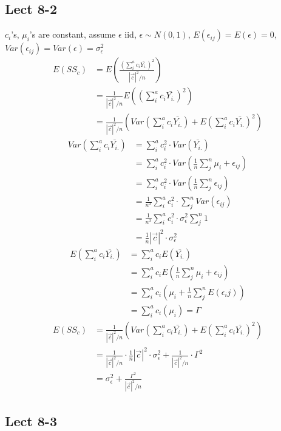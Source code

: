 \documentclass[11pt,letterpaper]{article}
\begin{document}
\subsection*{Lect 8-2}
\noindent $c_i$'s, $\mu_i$'s are constant, assume $\epsilon$ iid, $\epsilon \sim N(0, 1)$, $E(\epsilon_{ij}) = E(\epsilon) = 0$, $Var(\epsilon_{ij}) = Var(\epsilon) = \sigma_{\epsilon}^2$
\begin{align*}
E(SS_c) &= E( \frac{(\sum_i^a c_i \bar{Y_{i.}})^2}{|\vec{c}|^2 / n} ) \\
&= \frac{1}{|\vec{c}|^2 / n} E((\sum_i^a c_i \bar{Y_{i.}})^2 ) \\
&= \frac{1}{|\vec{c}|^2 / n} (Var(\sum_i^a c_i \bar{Y_{i.}}) + E(\sum_i^a c_i \bar{Y_{i.}})^2) 
\end{align*}
\begin{align*}
Var(\sum_i^a c_i \bar{Y_{i.}}) &= \sum_i^a c_i^2 \cdot  Var( \bar{Y_{i.}} ) \\
&= \sum_i^a c_i^2 \cdot Var(\frac{1}{n} \sum_j^n \mu_i + \epsilon_{ij}) \\
&= \sum_i^a c_i^2 \cdot Var(\frac{1}{n} \sum_j^n  \epsilon_{ij}) \\
&= \frac{1}{n^2} \sum_i^a c_i^2 \cdot \sum_j^n Var(\epsilon_{ij}) \\
&= \frac{1}{n^2} \sum_i^a c_i^2 \cdot \sigma_{\epsilon}^2 \sum_j^n 1 \\
&= \frac{1}{n} | \vec{c} |^2  \cdot \sigma_{\epsilon}^2
\end{align*}
\begin{align*}
E(\sum_i^a c_i \bar{Y_{i.}} ) &= \sum_i^a c_i E(\bar{Y_{i.}}) \\
&= \sum_i^a c_i E(\frac{1}{n} \sum_j^n \mu_i + \epsilon_{ij}) \\
&= \sum_i^a c_i (\mu_i + \frac{1}{n} \sum_j^n E(\epsilon_ij)) \\
&= \sum_i^a c_i (\mu_i ) = \Gamma
\end{align*}
\begin{align*}
E(SS_c) &= \frac{1}{|\vec{c}|^2 / n} (Var(\sum_i^a c_i \bar{Y_{i.}}) + E(\sum_i^a c_i \bar{Y_{i.}})^2) \\
&= \frac{1}{|\vec{c}|^2 / n} \cdot \frac{1}{n} | \vec{c} |^2  \cdot \sigma_{\epsilon}^2 + \frac{1}{|\vec{c}|^2 / n} \cdot \Gamma^2 \\
&= \sigma_{\epsilon}^2 + \frac{\Gamma^2}{|\vec{c}|^2 / n}
\end{align*}

\subsection*{Lect 8-3}
\end{document}
